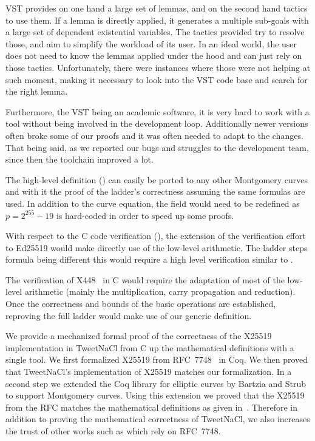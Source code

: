 VST provides on one hand a large set of lemmas, and on the second hand tactics to use them.
If a lemma is directly applied, it generates a multiple sub-goals with a large set of dependent existential variables.
The tactics provided try to resolve those, and aim to simplify the workload of its user.
In an ideal world, the user does not need to know the lemmas applied under the hood and can just rely on those tactics.
Unfortunately, there were instances where those were not helping
at such moment, making it necessary to look into the VST code base and search for the right lemma.

Furthermore, the VST being an academic software, it is very hard to work with a tool
without being involved in the development loop. Additionally newer versions often broke
some of our proofs and it was often needed to adapt to the changes. That being said,
as we reported our bugs and struggles to the development team, since then the toolchain improved a lot.

The high-level definition () can easily be ported to any
other Montgomery curves and with it the proof of the ladder's correctness
assuming the same formulas are used.
In addition to the curve equation, the field  would need to be redefined
as $p=2^{255}-19$ is hard-coded in order to speed up some proofs.

With respect to the C code verification (), the extension of
the verification effort to Ed25519 would make directly use of the low-level
arithmetic. The ladder steps formula being different this would require a high
level verification similar to .

The verification of \eg X448~\cite{cryptoeprint:2015:625,rfc7748} in C would
require the adaptation of most of the low-level arithmetic (mainly the
multiplication, carry propagation and reduction).
Once the correctness and bounds of the basic operations are established,
reproving the full ladder would make use of our generic definition.

We provide a mechanized formal proof of the correctness of the X25519
implementation in TweetNaCl from C up the mathematical definitions with a single tool.
We first formalized X25519 from RFC~7748~\cite{rfc7748} in Coq.
We then proved that TweetNaCl's implementation of X25519 matches our formalization.
In a second step we extended the Coq library for elliptic curves \cite{BartziaS14}
by Bartzia and Strub to support Montgomery curves.
Using this extension we proved that the X25519 from the RFC matches the
mathematical definitions as given in~\cite[Sec.~2]{Ber06}.
Therefore in addition to proving the mathematical correctness of TweetNaCl,
we also increases the trust of other works such as
\cite{zinzindohoue2017hacl,Erbsen2016SystematicSO} which rely on RFC~7748.
